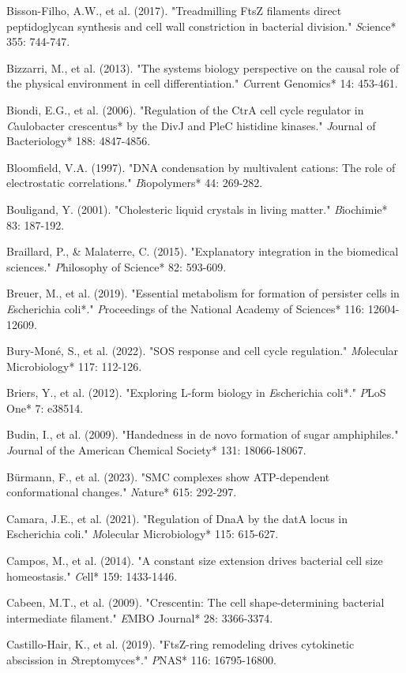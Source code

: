 \documentclass[11pt,a4paper]{article}
\begin{document}
Bisson-Filho, A.W., et al. (2017). "Treadmilling FtsZ filaments direct peptidoglycan synthesis and cell wall constriction in bacterial division." \textit*Science* 355: 744-747.

Bizzarri, M., et al. (2013). "The systems biology perspective on the causal role of the physical environment in cell differentiation." \textit*Current Genomics* 14: 453-461.

Biondi, E.G., et al. (2006). "Regulation of the CtrA cell cycle regulator in \textit*Caulobacter crescentus* by the DivJ and PleC histidine kinases." \textit*Journal of Bacteriology* 188: 4847-4856.

Bloomfield, V.A. (1997). "DNA condensation by multivalent cations: The role of electrostatic correlations." \textit*Biopolymers* 44: 269-282.

Bouligand, Y. (2001). "Cholesteric liquid crystals in living matter." \textit*Biochimie* 83: 187-192.

Braillard, P., & Malaterre, C. (2015). "Explanatory integration in the biomedical sciences." \textit*Philosophy of Science* 82: 593-609.

Breuer, M., et al. (2019). "Essential metabolism for formation of persister cells in \textit*Escherichia coli*." \textit*Proceedings of the National Academy of Sciences* 116: 12604-12609.

Bury-Moné, S., et al. (2022). "SOS response and cell cycle regulation." \textit*Molecular Microbiology* 117: 112-126.

Briers, Y., et al. (2012). "Exploring L-form biology in \textit*Escherichia coli*." \textit*PLoS One* 7: e38514.

Budin, I., et al. (2009). "Handedness in de novo formation of sugar amphiphiles." \textit*Journal of the American Chemical Society* 131: 18066-18067.

Bürmann, F., et al. (2023). "SMC complexes show ATP-dependent conformational changes." \textit*Nature* 615: 292-297.

Camara, J.E., et al. (2021). "Regulation of DnaA by the datA locus in Escherichia coli." \textit*Molecular Microbiology* 115: 615-627.

Campos, M., et al. (2014). "A constant size extension drives bacterial cell size homeostasis." \textit*Cell* 159: 1433-1446.

Cabeen, M.T., et al. (2009). "Crescentin: The cell shape-determining bacterial intermediate filament." \textit*EMBO Journal* 28: 3366-3374.

Castillo-Hair, K., et al. (2019). "FtsZ-ring remodeling drives cytokinetic abscission in \textit*Streptomyces*." \textit*PNAS* 116: 16795-16800.
\end{document}
